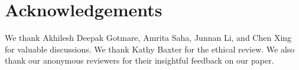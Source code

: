 \documentclass[11pt]{article}
\begin{document}
 \section*{Acknowledgements}
We thank Akhilesh Deepak Gotmare, Amrita Saha, Junnan Li, and  Chen Xing for valuable discussions.
We thank Kathy Baxter for the ethical review.
We also thank our anonymous reviewers for their insightful feedback on our paper. 

\end{document}
